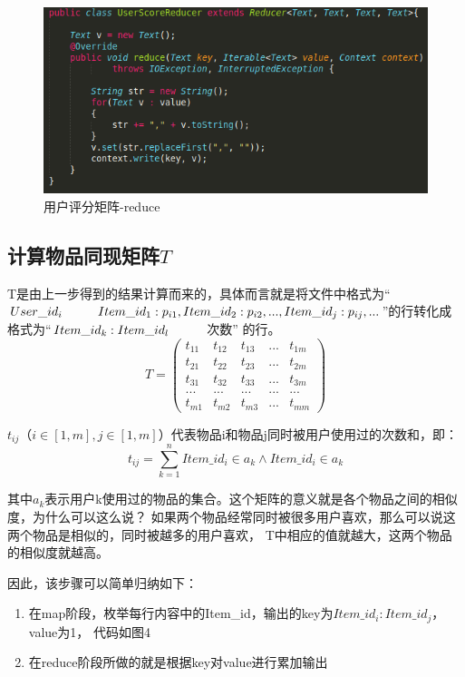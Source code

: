 \documentclass[12pt, a4paper]{article}
\newcommand\tab[1][1cm]{\hspace*{#1}}
\begin{document}
\begin{figure}[ht]
\centering
\includegraphics[scale=0.5]{r1.png}
\caption{用户评分矩阵-reduce}
\end{figure}

\subsection{计算物品同现矩阵$T$}
T是由上一步得到的结果计算而来的，具体而言就是将文件中格式为“$User\_id_i \tab Item\_id_1:p_{i1},
Item\_id_2:p_{i2},...,Item\_id_j:p_{ij},...$”的行转化成格式为“$Item\_id_k:Item\_id_l\tab$次数”
的行。
\begin{equation}       %
T =
\left(
  \begin{array}{ccccc}
    t_{11}  & t_{12}  & t_{13}  & ... & t_{1m}\\
    t_{21}  & t_{22}  & t_{23}  & ... & t_{2m}\\
    t_{31}  & t_{32}  & t_{33}  & ... & t_{3m}\\
    ...     & ...     & ...     & ... & ...\\
    t_{m1}  & t_{m2}  & t_{m3}  & ... & t_{mm}
  \end{array}
\right)
\end{equation}
\par $t_{ij}$（$i \in [1,m], j \in [1,m]$）代表物品i和物品j同时被用户使用过的次数和，即：
\begin{equation}
  t_{ij} = \sum_{k=1}^n Item\_id_i \in a_k \land Item\_id_i \in a_k
\end{equation}
\par 其中$a_k$表示用户k使用过的物品的集合。这个矩阵的意义就是各个物品之间的相似度，为什么可以这么说？
如果两个物品经常同时被很多用户喜欢，那么可以说这两个物品是相似的，同时被越多的用户喜欢，
T中相应的值就越大，这两个物品的相似度就越高。
\par 因此，该步骤可以简单归纳如下：
\begin{enumerate}
  \item 在map阶段，枚举每行内容中的Item\_id，输出的key为$Item\_id_i:Item\_id_j$，value为1，
  代码如图4
  \item 在reduce阶段所做的就是根据key对value进行累加输出
\end{enumerate}
\end{document}
